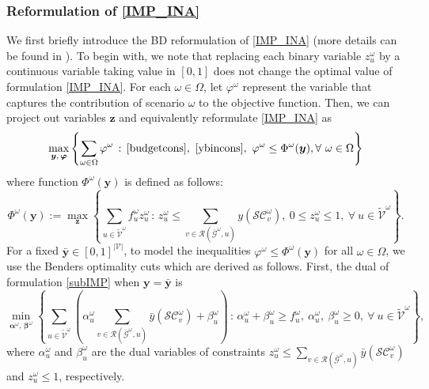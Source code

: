 \documentclass[a4paper,10pt]{article}
\theoremstyle{plain}
\newcommand{\revv}[1]{{#1}}
\begin{document}
{	\subsubsection{Reformulation of \eqref{IMP_INA}}
	\label{BDref}
	We first briefly introduce the BD reformulation of \eqref{IMP_INA} (more details can be found in \cite{Guney2020}).
	To begin with, we note that replacing each binary variable $z_u^\omega$ by a continuous variable taking value in $[0,1]$ does not change the optimal value of formulation \eqref{IMP_INA}.
	For each $\omega\in\Omega$, let $\revv{\varphi^\omega}$ represent \revv{the variable} that captures the contribution of scenario $\omega$ to the objective function.
	Then, we can project out variables $\boldsymbol{z}$ and equivalently reformulate \eqref{IMP_INA} as
	\begin{equation}\label{IMP2}
		\max_{\boldsymbol{y},\,\boldsymbol{\varphi}} \left\{\sum_{\omega\in\Omega}\varphi^{\omega}\,:\, 	\eqref{budgetcons},~\eqref{ybincons},~\varphi^{\omega}\leq\Phi^{\omega}(\boldsymbol{y}),\forall~ \omega\in\Omega\right\}
	\end{equation}
	where function $\Phi^{\omega}(\boldsymbol{y})$ is defined as follows:
	\begin{equation}\label{subIMP}
		\Phi^{\omega}(\boldsymbol{y}):=\max_{\boldsymbol{z}}\left\{\sum_{u\in\tilde{\mathcal{V}}^{\omega}}f_u^{\omega}z_u^{\omega}\,:\,
		z_u^{\omega}\leq\sum_{v\in\mathcal{R}(\bar{\mathcal{G}}^{\omega},u)}y(\mathcal{SC}_v^{\omega}),~0\leq z_u^{\omega}\leq 1,~\forall~ u\in\tilde{\mathcal{V}}^{\omega}\right\}.
	\end{equation}
	For a fixed $\bar{\boldsymbol{y}} \in {[0,1]}^{|\mathcal{V}|}$, to model the inequalities $\varphi^{\omega}\leq\Phi^{\omega}(\boldsymbol{y})$ for all $\omega\in\Omega$, we use the Benders optimality cuts which are derived as follows.
	First, the dual of formulation \eqref{subIMP} when $\boldsymbol{y}=\bar{\boldsymbol{y}}$ is
	\begin{equation}\label{dualsubIMP_fix_y}
		\min_{\boldsymbol{\alpha}^\omega,\,\boldsymbol{\beta}^\omega  }\left\{\sum_{u\in\tilde{\mathcal{V}}^{\omega}}\left(\alpha_u^{\omega}\sum_{v\in\mathcal{R}(\bar{\mathcal{G}}^{\omega},u)}\bar{y}(\mathcal{SC}_v^{\omega})+\beta_u^{\omega}\right)\,:\,\alpha_u^{\omega}+\beta_u^{\omega}\geq f_u^{\omega},~\alpha_u^{\omega},~\beta_u^{\omega}\geq0,~\forall~ u\in\tilde{\mathcal{V}}^{\omega}\right\},
	\end{equation}
	where $\alpha_u^{\omega}$ and $\beta_u^{\omega}$ are the dual variables of constraints $z_u^{\omega}\leq\sum_{v\in\mathcal{R}(\bar{\mathcal{G}}^{\omega},u)}\bar{y}(\mathcal{SC}_v^{\omega})$ and $z_u^{\omega}\leq 1$, respectively.
}
\end{document}
